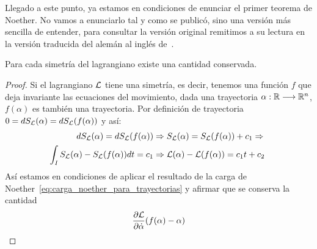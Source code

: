 Llegado a este punto, ya estamos en condiciones de enunciar el primer teorema de Noether.
No vamos a enunciarlo tal y como se publicó, sino una versión más sencilla de entender, para consultar la versión original remitimos a su lectura en la versión traducida del alemán al inglés de~\cite{Noether_1971}.

\begin{theorem}
	\label{thm:noether}
	Para cada simetría del lagrangiano existe una cantidad conservada.
\end{theorem}
\begin{proof}
	Si el lagrangiano $\mathcal{L}$ tiene una simetría, es decir, tenemos una función $f$ que deja invariante las ecuaciones del movimiento, dada una trayectoria $\alpha:\mathbb{R}\longrightarrow \mathbb{R}^n$, $f(\alpha)$ es también una trayectoria.
	Por definición de trayectoria $0=dS_{\mathcal{L}}(\alpha)=dS_{\mathcal{L}}(f(\alpha))$ y así:
	\begin{equation}
		\begin{split}
			\label{eq:teorema-noether}
			dS_{\mathcal{L}}(\alpha) = dS_{\mathcal{L}}(f(\alpha)) &\Rightarrow S_{\mathcal{L}}(\alpha)=S_{\mathcal{L}}(f(\alpha))+c_1\Rightarrow\\
			\int_I S_{\mathcal{L}}(\alpha)-S_{\mathcal{L}}(f(\alpha)) dt= c_1 &\Rightarrow \mathcal{L}(\alpha)-\mathcal{L}(f(\alpha))=c_1 t + c_2\
		\end{split}
	\end{equation}
	Así estamos en condiciones de aplicar el resultado de la carga de Noether~\eqref{eq:carga_noether_para_trayectorias} y afirmar que se conserva la cantidad
	\begin{equation*}
		\frac{\partial \mathcal{L}}{\partial\dot{\alpha}}(f(\alpha)-\alpha)
	\end{equation*}
\end{proof}
